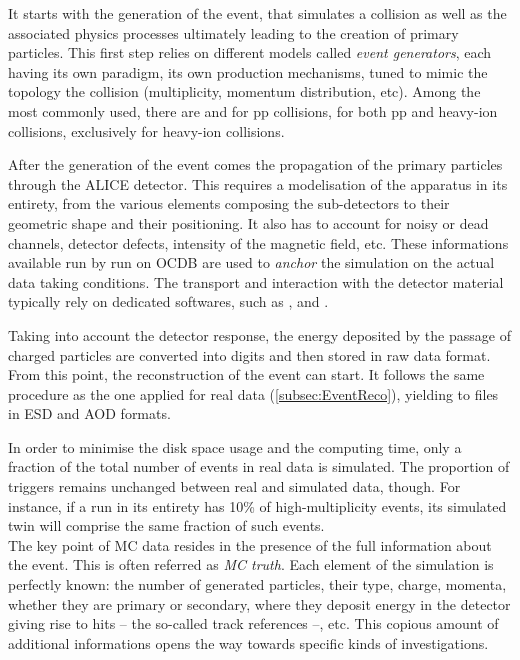 It starts with the generation of the event, that simulates a collision as well as the associated physics processes ultimately leading to the creation of primary particles. This first step relies on different models called \textit{event generators}, each having its own paradigm, its own production mechanisms, tuned to mimic the topology the collision (multiplicity, momentum distribution, etc). Among the most commonly used, there are \Pythia \cite{bierlichComprehensiveGuidePhysics2022} and \Herwig \cite{bahrHerwigPhysicsManual2008} for pp collisions, \Epos \cite{pierogEPOSLHCTest2015} for both pp and heavy-ion collisions, \Hijing \cite{wangHIJINGMonteCarlo1994} exclusively for heavy-ion collisions.

After the generation of the event comes the propagation of the primary particles through the ALICE detector. This requires a modelisation of the apparatus in its entirety, from the various elements composing the sub-detectors to their geometric shape and their positioning. It also has to account for noisy or dead channels, detector defects, intensity of the magnetic field, etc. These informations available run by run on OCDB are used to \textit{anchor} the simulation on the actual data taking conditions. The transport and interaction with the detector material typically rely on dedicated softwares, such as \GeantThree \cite{brunGEANTUserGuide1987}, \GeantFour \cite{geant4Geant4HomePage} and \Fluka \cite{battistoniOverviewFLUKACode2015}.

Taking into account the detector response, the energy deposited by the passage of charged particles are converted into digits and then stored in raw data format. From this point, the reconstruction of the event can start. It follows the same procedure as the one applied for real data (\Sec\ref{subsec:EventReco}), yielding to files in ESD and AOD formats.

In order to minimise the disk space usage and the computing time, only a fraction of the total number of events in real data is simulated. The proportion of triggers remains unchanged between real and simulated data, though. For instance, if a run in its entirety has 10\% of high-multiplicity events, its simulated twin will comprise the same fraction of such events.\\

The key point of MC data resides in the presence of the full information about the event. This is often referred as \textit{MC truth}. Each element of the simulation is perfectly known: the number of generated particles, their type, charge, momenta, whether they are primary or secondary, where they deposit energy in the detector giving rise to hits -- the so-called track references --, etc. This copious amount of additional informations opens the way towards specific kinds of investigations. 

